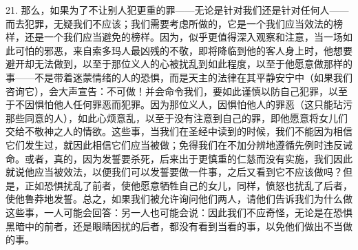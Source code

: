21. 那么，如果为了不让别人犯更重的罪——无论是针对我们还是针对任何人——而去犯罪，无疑我们不应该；我们需要考虑所做的，它是一个我们应当效法的榜样，还是一个我们应当避免的榜样。因为，似乎更值得深入观察和注意，当一场如此可怕的邪恶，来自索多玛人最凶残的不敬，即将降临到他的客人身上时，他想要避开却无法做到，以至于那位义人的心被扰乱到如此程度，以至于他愿意做那样的事——不是带着迷蒙情绪的人的恐惧，而是天主的法律在其平静安宁中（如果我们咨询它），会大声宣告：不可做！并会命令我们，要如此谨慎以防自己犯罪，以至于不因惧怕他人任何罪恶而犯罪。因为那位义人，因惧怕他人的罪恶（这只能玷污那些同意的人），如此心烦意乱，以至于没有注意到自己的罪，即他愿意将女儿们交给不敬神之人的情欲。这些事，当我们在圣经中读到的时候，我们不能因为相信它们发生过，就因此相信它们应当被做；免得我们在不加分辨地遵循先例时违反诫命。或者，真的，因为发誓要杀死，后来出于更慎重的仁慈而没有实施，我们因此就说他应当被效法，以便我们可以发誓要做一件事，之后又看到它不应该做吗？但是，正如恐惧扰乱了前者，使他愿意牺牲自己的女儿，同样，愤怒也扰乱了后者，使他鲁莽地发誓。总之，如果我们被允许询问他们两人，请他们告诉我们为什么做这些事，一人可能会回答：另一人也可能会说：因此我们不应奇怪，无论是在恐惧黑暗中的前者，还是眼睛困扰的后者，都没有看到当看的事，以免他们做出不当做的事。\par

